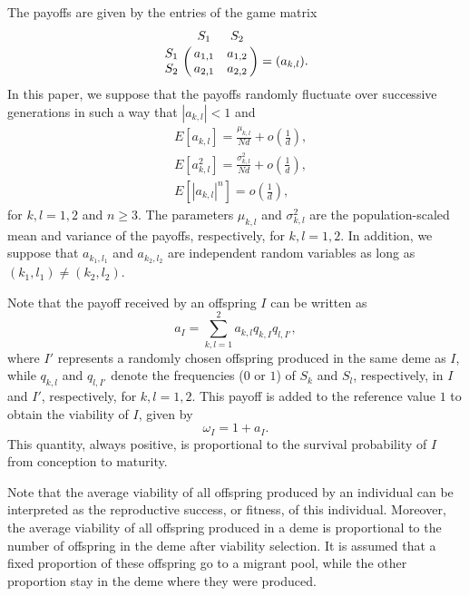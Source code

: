 \documentclass[11pt]{article}
\begin{document}
The payoffs are given by the entries of the game matrix
\begin{equation}\label{sec1-eq1}
\bordermatrix {
& S_1 & S_2 \cr
S_1& a_{1,1} & a_{1,2} \cr
S_2 & a_{2,1} &a_{2,2} \cr}=(a_{k,l}).
\end{equation}
 In this paper, we suppose that the payoffs randomly fluctuate over successive generations in such a way that $|a_{k,l}|<1$ and
\begin{subequations}\label{sec1-eq2}
\begin{align}
&E\left[a_{k,l}\right]=\frac{\mu_{k,l}}{Nd}+o\left(\frac{1}{d}\right),\\
&E\left[a_{k,l}^2\right]=\frac{\sigma^2_{k,l}}{Nd}+o\left(\frac{1}{d}\right),\\
&E\left[|a_{k,l}|^n\right]=o\left(\frac{1}{d}\right),
\end{align}
\end{subequations}
for $k,l=1,2$ and $n\geq 3$. The parameters $\mu_{k,l}$ and $\sigma^2_{k,l}$ are the population-scaled mean and variance of the payoffs, respectively, for $k,l=1,2$. In addition, we suppose that $a_{k_1,l_1}$ and $a_{k_2,l_2}$ are independent random variables as long as $(k_1,l_1)\not=(k_2,l_2)$.


Note that the payoff received by an offspring $I$ can be written as  
\begin{equation}\label{sec1-eq4}
a_{I}=\sum_{k,l=1}^{2}a_{k,l}q_{k,I}q_{l,I'},
\end{equation}
where $I'$ represents a randomly chosen offspring produced in the same deme as $I$, while $q_{k,l}$ and $q_{l,I'}$ denote the frequencies ($0$ or $1$) of $S_k$ and $S_l$, respectively, in $I$ and $I'$, respectively, for $k,l=1, 2$. This payoff is added to the reference value $1$ to obtain the viability of $I$, given by
\begin{equation}\label{sec1-eq5}
\omega_{I}=1+a_{I}.
\end{equation}
This quantity, always positive, is proportional to the survival probability of $I$ from conception to maturity. 

Note that the average viability of all offspring produced by an individual can be interpreted as the reproductive success, or fitness, of this individual. Moreover, the average viability of all offspring produced in a deme is proportional to the number of offspring in the deme after viability selection. It is assumed that a fixed proportion of these offspring go to a migrant pool, while the other proportion stay in the deme where they were produced. 
\end{document}
